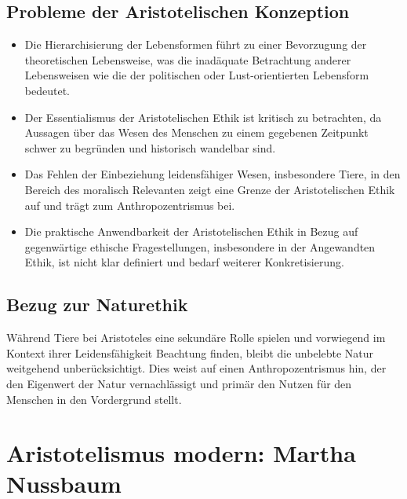 \documentclass{article}
\begin{document}
\subsection{Probleme der Aristotelischen Konzeption}

\begin{itemize}
	\item Die Hierarchisierung der Lebensformen führt zu einer Bevorzugung der theoretischen Lebensweise, was die inadäquate Betrachtung anderer Lebensweisen wie die der politischen oder Lust-orientierten Lebensform bedeutet.

	\item Der Essentialismus der Aristotelischen Ethik ist kritisch zu betrachten, da Aussagen über das Wesen des Menschen zu einem gegebenen Zeitpunkt schwer zu begründen und historisch wandelbar sind.

	\item Das Fehlen der Einbeziehung leidensfähiger Wesen, insbesondere Tiere, in den Bereich des moralisch Relevanten zeigt eine Grenze der Aristotelischen Ethik auf und trägt zum Anthropozentrismus bei.

	\item Die praktische Anwendbarkeit der Aristotelischen Ethik in Bezug auf gegenwärtige ethische Fragestellungen, insbesondere in der Angewandten Ethik, ist nicht klar definiert und bedarf weiterer Konkretisierung.
\end{itemize}

\subsection{Bezug zur Naturethik}

Während Tiere bei Aristoteles eine sekundäre Rolle spielen und vorwiegend im Kontext ihrer Leidensfähigkeit Beachtung finden, bleibt die unbelebte Natur weitgehend unberücksichtigt. Dies weist auf einen Anthropozentrismus hin, der den Eigenwert der Natur vernachlässigt und primär den Nutzen für den Menschen in den Vordergrund stellt.


\newpage
\section{Aristotelismus modern: Martha Nussbaum}
\end{document}
